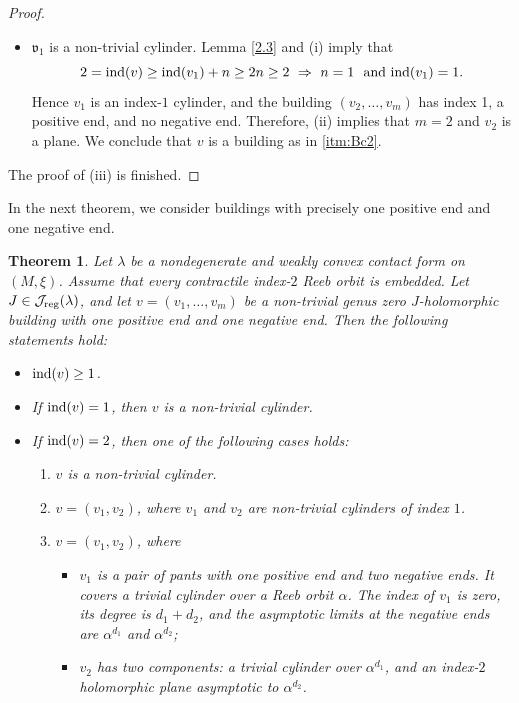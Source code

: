\documentclass{amsart}
\newtheorem{theorem}{Theorem}[section]
\newcommand{\ind}{\textnormal{ind}}
\begin{document}
\begin{proof}
\begin{itemize}
 
 \item  $\mathfrak{v}_1$ is a non-trivial cylinder. Lemma \ref{2.3} and (i) imply that
 $$2=\ind(v)\geq \ind(v_1)+n \geq 2n \geq 2 \,\,\Rightarrow \,\, n=1 \ \mbox{ and } \ind(v_1)=1. $$
 Hence $v_1$ is an index-$1$ cylinder, and the building $(v_2,\ldots,v_m)$ has index 1, a positive end, and no negative end. Therefore, (ii) implies that $m=2$ and $v_2$ is a plane. We conclude that $v$ is a building as in \ref{itm:Bc2}.
\end{itemize}
The proof of (iii) is finished.
\end{proof}

In the next theorem, we consider buildings with precisely one positive end and one negative end.

\begin{theorem} \label{C} 
Let $\lambda$ be a nondegenerate and weakly convex  contact form on $(M,\xi)$. Assume that every contractile index-$2$ Reeb orbit is embedded. Let $J\in \mathcal{J}_{\rm reg}(\lambda)$, and let $v=(v_1, \ldots, v_m)$ be a non-trivial genus zero $J$-holomorphic building with one positive end and one negative end. Then the following statements hold:
\begin{itemize}
\item[(i)] $\ind(v) \geq 1$.
\item[(ii)] If $\ind(v)=1$, then $v$ is a non-trivial cylinder.
\item[(iii)] If $\ind(v)=2$, then one of the following cases holds:
  \begin{enumerate}[label=(iii.\arabic*)]
  
   \item \label{itm:i} $v$ is a non-trivial cylinder.
   
   \item \label{itm:ii} $v=(v_1,v_2)$, where $v_1$ and $v_2$ are non-trivial cylinders of index $1$.
   
   \item \label{itm:iii} $v=(v_1,v_2)$, where 
    \begin{itemize}
   \item $v_1$  is a pair of pants with one positive end and two negative ends. It covers a trivial cylinder over a Reeb orbit $\alpha$. The index of $v_1$ is zero, its degree is $d_1 + d_2$, and the asymptotic limits at the negative ends are  $\alpha^{d_1}$ and $\alpha^{d_2}$;
   \item $v_2$ has two components:  a trivial cylinder over $\alpha^{d_1}$, and an index-$2$ holomorphic plane asymptotic to $\alpha^{d_2}$.
    \end{itemize}
    

\end{enumerate}
\end{itemize}
\end{theorem}
\end{document}
